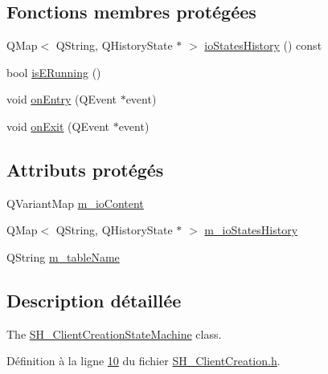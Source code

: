 \subsection*{Fonctions membres protégées}
\begin{DoxyCompactItemize}
\item 
Q\-Map$<$ Q\-String, Q\-History\-State $\ast$ $>$ \hyperlink{classSimpleHotel_1_1SH__InOutStateMachine_a0f59a90204a7cbb6835da28cd234978f}{io\-States\-History} () const 
\item 
bool \hyperlink{classSimpleHotel_1_1SH__InOutStateMachine_a6ca4ef874eaaf2446c1a65e6bcbfc46b}{is\-E\-Running} ()
\item 
void \hyperlink{classSimpleHotel_1_1SH__GenericStateMachine_a42c47602883a70ef4965cff373cd5ab6}{on\-Entry} (Q\-Event $\ast$event)
\item 
void \hyperlink{classSimpleHotel_1_1SH__GenericStateMachine_adecc9814338e400f9fce1cc637f1e081}{on\-Exit} (Q\-Event $\ast$event)
\end{DoxyCompactItemize}
\subsection*{Attributs protégés}
\begin{DoxyCompactItemize}
\item 
Q\-Variant\-Map \hyperlink{classSimpleHotel_1_1SH__InOutStateMachine_a4b0a3a48b0da31fddb724a357ad9b52c}{m\-\_\-io\-Content}
\item 
Q\-Map$<$ Q\-String, Q\-History\-State $\ast$ $>$ \hyperlink{classSimpleHotel_1_1SH__InOutStateMachine_a45a7defb15e50a196bc471017fc86eb4}{m\-\_\-io\-States\-History}
\item 
Q\-String \hyperlink{classSimpleHotel_1_1SH__InOutStateMachine_a15c063debdaa4c87bd4925867a13ce9e}{m\-\_\-table\-Name}
\end{DoxyCompactItemize}


\subsection{Description détaillée}
The \hyperlink{classSimpleHotel_1_1SH__ClientCreationStateMachine}{S\-H\-\_\-\-Client\-Creation\-State\-Machine} class. 

Définition à la ligne \hyperlink{SH__ClientCreation_8h_source_l00010}{10} du fichier \hyperlink{SH__ClientCreation_8h_source}{S\-H\-\_\-\-Client\-Creation.\-h}.



